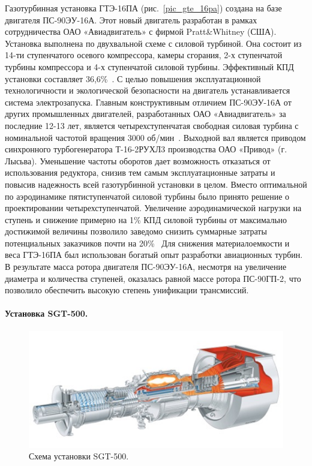 \documentclass[a4paper,12pt]{article}
\begin{document}
    Газотурбинная установка ГТЭ-16ПА (рис.~\ref{pic_gte_16pa}) создана на базе двигателя ПС-90ЭУ-16А.
    Этот новый двигатель разработан в рамках сотрудничества ОАО «Авиадвигатель» с фирмой Pratt\&Whitney (США).
    Установка выполнена по двухвальной схеме с силовой турбиной.
    Она состоит из 14-ти ступенчатого осевого компрессора, камеры сгорания, 2-х ступенчатой турбины
    компрессора и 4-х ступенчатой силовой турбины.
    Эффективный КПД установки составляет 36,6\%~\cite{aviadvig}.
    С целью повышения эксплуатационной технологичности и экологической безопасности на двигатель
    устанавливается система электрозапуска.
    Главным конструктивным отличием ПС-90ЭУ-16А от других промышленных двигателей, разработанных
    ОАО «Авиадвигатель» за последние 12-13 лет, является четырехступенчатая свободная силовая турбина с номинальной
    частотой вращения 3000 об/мин~\cite{gtes-16pa}.
    Выходной вал является приводом синхронного турбогенератора Т-16-2РУХЛ3 производства ОАО «Привод» (г. Лысьва).
    Уменьшение частоты оборотов дает возможность отказаться от использования редуктора, снизив тем самым
    эксплуатационные затраты и повысив надежность всей газотурбинной установки в целом.
    Вместо оптимальной по аэродинамике пятиступенчатой силовой турбины было принято решение о
    проектировании четырехступенчатой.
    Увеличение аэродинамической нагрузки на ступень и снижение примерно на 1\% КПД силовой турбины от максимально
    достижимой величины позволило заведомо снизить суммарные затраты потенциальных заказчиков почти на 20\%~\cite{raz_konstr_perm}
    Для снижения материалоемкости и веса ГТЭ-16ПА был использован богатый опыт разработки авиационных турбин.
    В результате масса ротора двигателя ПС-90ЭУ-16А, несмотря на увеличение диаметра и количества ступеней,
    оказалась равной массе ротора ПС-90ГП-2, что позволило обеспечить высокую степень унификации трансмиссий.~\cite{raz_konstr_perm}


    \paragraph{Установка SGT-500.}

    \begin{figure}[h!]
        \centering
        \includegraphics[scale=1.0]{./pictures/SGT-500.png}
        \caption{Схема установки SGT-500.}
        \label{pic_stg_500}
    \end{figure}
\end{document}
